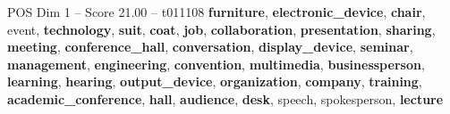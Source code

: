 \begin{textsample}{POS Dim 1 – Score 21.00 – t011108}  \label{ex:f1_pos_039}
\textbf{furniture}, \textbf{electronic\_device}, \textbf{chair}, event, \textbf{technology}, \textbf{suit}, \textbf{coat}, \textbf{job}, \textbf{collaboration}, \textbf{presentation}, \textbf{sharing}, \textbf{meeting}, \textbf{conference\_hall}, \textbf{conversation}, \textbf{display\_device}, \textbf{seminar}, \textbf{management}, \textbf{engineering}, \textbf{convention}, \textbf{multimedia}, \textbf{businessperson}, \textbf{learning}, \textbf{hearing}, \textbf{output\_device}, \textbf{organization}, \textbf{company}, \textbf{training}, \textbf{academic\_conference}, \textbf{hall}, \textbf{audience}, \textbf{desk}, speech, spokesperson, \textbf{lecture}

\end{textsample}
